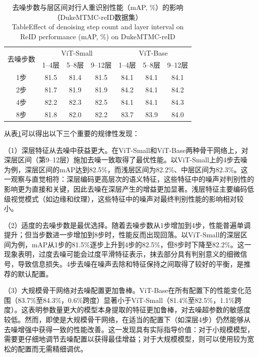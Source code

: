 \begin{table}[htbp]
\centering
\caption{去噪步数与层区间对行人重识别性能（mAP, \%）的影响（DukeMTMC-reID数据集）\protect\\[-2pt]{\rm Table\;\thetable\quad Effect of denoising step count and layer interval on ReID performance (mAP, \%) on DukeMTMC-reID}}\label{tab:chap3_layer_config}
\vspace{0.2cm}
\renewcommand{\arraystretch}{1.2}
\begin{tabular}{c|ccc|ccc}
\hline\hline
\multirow{2}{*}{去噪步数} & \multicolumn{3}{c|}{ViT-Small} & \multicolumn{3}{c}{ViT-Base} \\
 & 1--4层 & 5--8层 & 9--12层 & 1--4层 & 5--8层 & 9--12层 \\
\hline
1步 & 81.5 & 81.4 & 81.5 & 84.1 & 84.1 & 84.1 \\
2步 & 81.7 & 81.9 & 81.9 & 84.2 & 84.1 & 84.2 \\
4步 & 82.2 & 82.3 & 82.5 & 84.1 & 84.1 & 84.3 \\
8步 & 81.8 & 82.0 & 82.2 & 83.7 & 83.9 & 84.0 \\
\hline\hline
\end{tabular}
\end{table}

从表\ref{tab:chap3_layer_config}可以得出以下三个重要的规律性发现：

（1）深层特征从去噪中获益更大。在ViT-Small和ViT-Base两种骨干网络上，对深层区间（第9--12层）施加去噪一致取得了最优性能。以ViT-Small上的4步去噪为例，深层区间的mAP达到82.5\%，而浅层区间为82.2\%、中层区间为82.3\%。这一观察与直觉相符：深层编码更高层次的语义特征，这些特征中的噪声对判别性的影响更为直接和关键，因此去噪在深层产生的增益更加显著。浅层特征主要编码低级视觉模式（如边缘和纹理），这些特征中的噪声对最终判别性能的影响相对较小。

（2）适度的去噪步数是最优选择。随着去噪步数从1步增加到4步，性能普遍单调提升；但当步数进一步增加到8步时，性能反而出现回落。以ViT-Small的深层区间为例，mAP从1步的81.5\%逐步上升到4步的82.5\%，但8步时下降至82.2\%。这一现象表明，过度去噪可能会过度平滑特征表示，抹去部分具有判别意义的细微信号，导致信息损失。4步去噪在噪声去除和特征保持之间取得了较好的平衡，是推荐的默认配置。

（3）大规模骨干网络对去噪配置更加鲁棒。ViT-Base在所有配置下的性能变化范围（83.7\%至84.3\%，0.6\%跨度）显著小于ViT-Small（81.4\%至82.5\%，1.1\%跨度）。这表明参数量更大的模型本身提取的特征更加鲁棒，对去噪超参数的敏感度较低。然而，即使是大规模骨干网络，在适当的配置下（如深层4步）仍然能够从去噪增强中获得一致的性能改善。这一发现具有实际指导价值：对于小规模模型，需要更仔细地调节去噪配置以获得最佳增益；对于大规模模型，则可以使用较为宽松的配置而无需精细调优。

